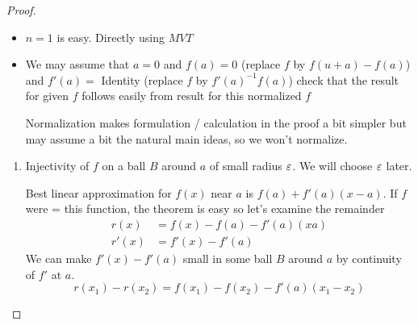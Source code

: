 \begin{proof}
	\begin{itemize}
		\item $n=1$ is easy. Directly using $MVT$
		\item We may assume  that $a=0$  and $f(a)=0$ (replace $f$ by $f(u+a)-f(a)$) and $f'(a)=$ Identity (replace $f$ by $f'(a)^{-1}f(a)$) check that the result  for given $f$ follows easily from result for this normalized $f$
		\parinn
		
		Normalization makes formulation / calculation  in the proof a bit simpler but may assume a  bit the natural main ideas, so we won't normalize.
	\end{itemize}
\begin{enumerate}[label=\bfseries\tiny\protect\circled{\small\arabic*}]
	\item Injectivity of $f$ on a ball $B$ around $a$ of small radius $\varepsilon$. We will choose $\varepsilon$ later.
	
	Best linear approximation for $f(x)$ near $a$ is $f(a)+f'(a)(x-a)$. If $f$ were = this function, the theorem is easy so let's examine the remainder \begin{align*}
		r(x) & = f(x)-f(a)-f'(a)(xa)\\
		r'(x) & = f'(x)-f'(a)
	\end{align*}
We can make $f'(x)-f'(a)$ small in some ball $B$ around $a$ by continuity of $f'$ at  $a$. $$r(x_1)-r(x_2)=f(x_1)-f(x_2)-f'(a)(x_1-x_2)$$


\end{enumerate}
\end{proof}
